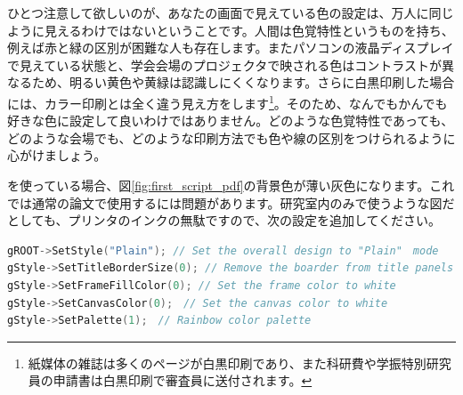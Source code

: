 ひとつ注意して欲しいのが、あなたの画面で見えている色の設定は、万人に同じように見えるわけではないということです。人間は色覚特性というものを持ち、例えば赤と緑の区別が困難な人も存在します。またパソコンの液晶ディスプレイで見えている状態と、学会会場のプロジェクタで映される色はコントラストが異なるため、明るい黄色や黄緑は認識しにくくなります。さらに白黒印刷した場合には、カラー印刷とは全く違う見え方をします\footnote{紙媒体の雑誌は多くのページが白黒印刷であり、また科研費や学振特別研究員の申請書は白黒印刷で審査員に送付されます。}。そのため、なんでもかんでも好きな色に設定して良いわけではありません。どのような色覚特性であっても、どのような会場でも、どのような印刷方法でも色や線の区別をつけられるように心がけましょう。

を使っている場合、図\ref{fig:first_script_pdf}の背景色が薄い灰色になります。これでは通常の論文で使用するには問題があります。研究室内のみで使うような図だとしても、プリンタのインクの無駄ですので、次の設定を追加してください。

\begin{lstlisting}[language=c++]
gROOT->SetStyle("Plain"); // Set the overall design to "Plain"　mode
gStyle->SetTitleBorderSize(0); // Remove the boarder from title panels
gStyle->SetFrameFillColor(0); // Set the frame color to white
gStyle->SetCanvasColor(0);　// Set the canvas color to white
gStyle->SetPalette(1);　// Rainbow color palette
\end{lstlisting}

